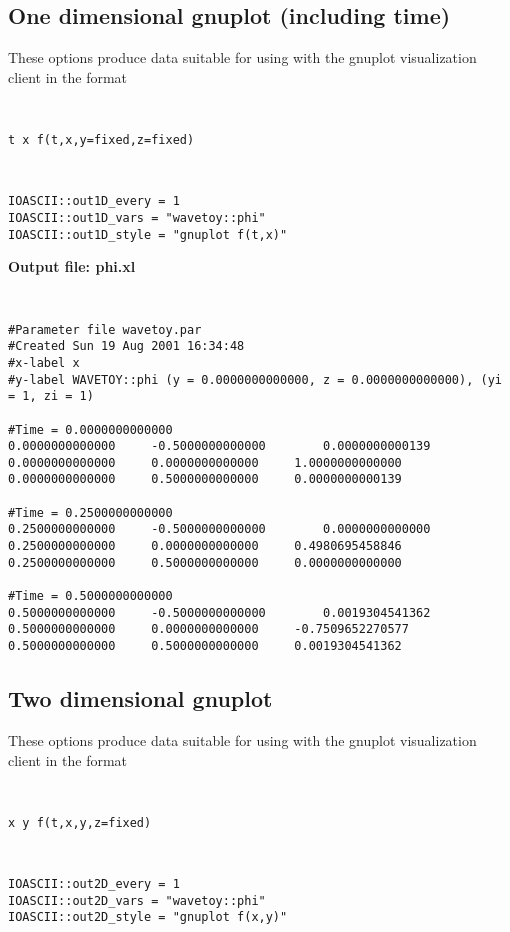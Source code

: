 \documentclass{article}
\begin{document}
\subsection{One dimensional gnuplot (including time)}

These options produce data suitable for using with the gnuplot visualization client in the format
{\tt
\begin{verbatim}
t x f(t,x,y=fixed,z=fixed)
\end{verbatim}
}

{\tt
\begin{verbatim}
IOASCII::out1D_every = 1
IOASCII::out1D_vars = "wavetoy::phi"
IOASCII::out1D_style = "gnuplot f(t,x)"
\end{verbatim}
}

\noindent
{\bf Output file: phi.xl}
{\tt
\begin{verbatim}
#Parameter file wavetoy.par
#Created Sun 19 Aug 2001 16:34:48
#x-label x
#y-label WAVETOY::phi (y = 0.0000000000000, z = 0.0000000000000), (yi = 1, zi = 1) 

#Time = 0.0000000000000
0.0000000000000		-0.5000000000000		0.0000000000139
0.0000000000000		0.0000000000000		1.0000000000000
0.0000000000000		0.5000000000000		0.0000000000139

#Time = 0.2500000000000
0.2500000000000		-0.5000000000000		0.0000000000000
0.2500000000000		0.0000000000000		0.4980695458846
0.2500000000000		0.5000000000000		0.0000000000000

#Time = 0.5000000000000
0.5000000000000		-0.5000000000000		0.0019304541362
0.5000000000000		0.0000000000000		-0.7509652270577
0.5000000000000		0.5000000000000		0.0019304541362
\end{verbatim}
}

\subsection{Two dimensional gnuplot}

These options produce data suitable for using with the gnuplot visualization client in the format
{\tt
\begin{verbatim}
x y f(t,x,y,z=fixed)
\end{verbatim}
}


{\tt
\begin{verbatim}
IOASCII::out2D_every = 1
IOASCII::out2D_vars = "wavetoy::phi"
IOASCII::out2D_style = "gnuplot f(x,y)"
\end{verbatim}
}
\end{document}
